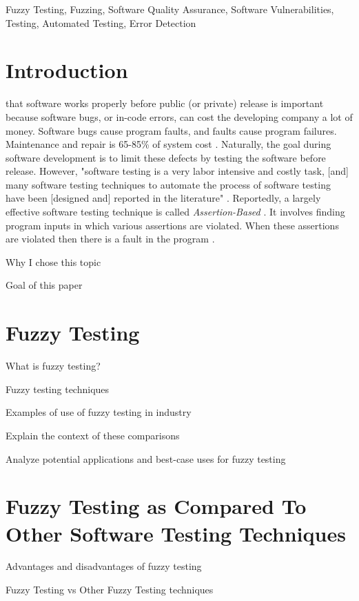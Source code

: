 \documentclass[10pt, final, journal, letterpaper, twoside, twocolumn]{IEEEtran}
\begin{document}
\begin{IEEEkeywords}
	Fuzzy Testing, Fuzzing, Software Quality Assurance, Software Vulnerabilities, Testing, Automated Testing, Error Detection
\end{IEEEkeywords}

\section{Introduction}
	 that software works properly before public (or private) release is important because software bugs, or in-code errors, can cost the developing company a lot of money. Software bugs cause program faults, and faults cause program failures. Maintenance and repair is 65-85\% of system cost \cite{slides}. Naturally, the goal during software development is to limit these defects by testing the software before release. However, "software testing is a very labor intensive and costly task, [and] many software testing techniques to automate the process of software testing have been [designed and] reported in the literature" \cite{fuzzy-logic}. Reportedly, a largely effective software testing technique is called \textit{Assertion-Based} \cite{assertion-testing}. It involves finding program inputs in which various assertions are violated. When these assertions are violated then there is a fault in the program \cite{assertion-testing}.
	
	Why I chose this topic
	
	Goal of this paper


\section{Fuzzy Testing}
	What is fuzzy testing?
	
	Fuzzy testing techniques
	
	Examples of use of fuzzy testing in industry
	
	\indent\indent Explain the context of these comparisons
		
	Analyze potential applications and best-case uses for fuzzy testing
	

\section{Fuzzy Testing as Compared To Other Software Testing Techniques}
	Advantages and disadvantages of fuzzy testing
	
	Fuzzy Testing vs Other Fuzzy Testing techniques
\end{document}
